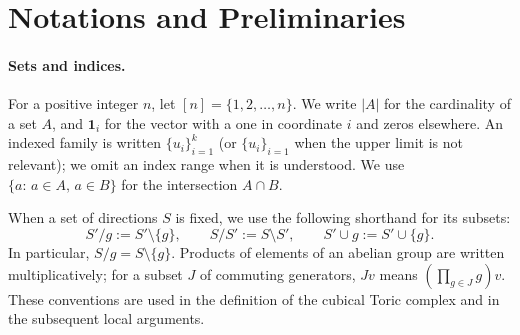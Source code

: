 \section{Notations and Preliminaries}\label{sec:nota}

\paragraph{Sets and indices.}
For a positive integer $n$, let $[n]=\{1,2,\ldots,n\}$. We write $|A|$ for the cardinality of a set $A$, and $\mathbf{1}_i$ for the vector with a one in coordinate $i$ and zeros elsewhere. An indexed family is written $\{u_i\}_{i=1}^k$ (or $\{u_i\}_{i=1}$ when the upper limit is not relevant); we omit an index range when it is understood. We use $\{a:\,a\in A,\,a\in B\}$ for the intersection $A\cap B$.

When a set of directions $S$ is fixed, we use the following shorthand for its subsets:
\begin{equation*}
  S'/g := S'\setminus\{g\},\qquad
  S/S' := S\setminus S',\qquad
  S'\cup g := S'\cup\{g\}.
\end{equation*}
In particular, $S/g=S\setminus\{g\}$. Products of elements of an abelian group are written multiplicatively; for a subset $J$ of commuting generators, $Jv$ means $(\prod_{g\in J}g)v$. These conventions are used in the definition of the cubical Toric complex and in the subsequent local arguments.

%


